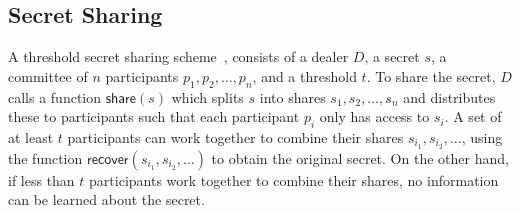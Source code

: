 \subsection{Secret Sharing}
A threshold secret sharing scheme~\cite{shamir_ss}, consists of a dealer $D$, a secret $s$, a committee of $n$ participants $p_1, p_2, \dots, p_n$, and a threshold $t$.
To share the secret, $D$ calls a function $\textsf{share}(s)$ which splits $s$ into shares $s_1, s_2, \dots, s_n$ and distributes these to participants such that each participant $p_i$ only has access to $s_i$.
A set of at least $t$ participants can work together to combine their shares $s_{i_1}, s_{i_2}, \dots$, using the function $\textsf{recover}(s_{i_1}, s_{i_2}, \dots)$ to obtain the original secret.
On the other hand, if less than $t$ participants work together to combine their shares, no information can be learned about the secret.